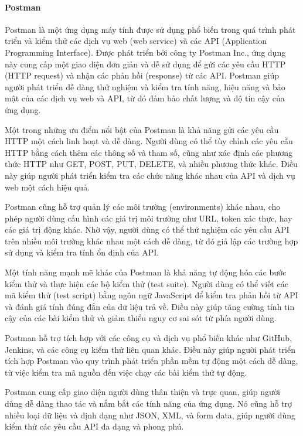 \paragraph{Postman}
\mbox{}

Postman là một ứng dụng máy tính được sử dụng phổ biến trong quá trình phát triển và kiểm thử các dịch vụ web (web service) và các API (Application Programming Interface). Được phát triển bởi công ty Postman Inc., ứng dụng này cung cấp một giao diện đơn giản và dễ sử dụng để gửi các yêu cầu HTTP (HTTP request) và nhận các phản hồi (response) từ các API. Postman giúp người phát triển dễ dàng thử nghiệm và kiểm tra tính năng, hiệu năng và bảo mật của các dịch vụ web và API, từ đó đảm bảo chất lượng và độ tin cậy của ứng dụng.

Một trong những ưu điểm nổi bật của Postman là khả năng gửi các yêu cầu HTTP một cách linh hoạt và dễ dàng. Người dùng có thể tùy chỉnh các yêu cầu HTTP bằng cách thêm các thông số và tham số, cũng như xác định các phương thức HTTP như GET, POST, PUT, DELETE, và nhiều phương thức khác. Điều này giúp người phát triển kiểm tra các chức năng khác nhau của API và dịch vụ web một cách hiệu quả.

Postman cũng hỗ trợ quản lý các môi trường (environments) khác nhau, cho phép người dùng cấu hình các giá trị môi trường như URL, token xác thực, hay các giá trị động khác. Nhờ vậy, người dùng có thể thử nghiệm các yêu cầu API trên nhiều môi trường khác nhau một cách dễ dàng, từ đó giả lập các trường hợp sử dụng và kiểm tra tính ổn định của API.

Một tính năng mạnh mẽ khác của Postman là khả năng tự động hóa các bước kiểm thử và thực hiện các bộ kiểm thử (test suite). Người dùng có thể viết các mã kiểm thử (test script) bằng ngôn ngữ JavaScript để kiểm tra phản hồi từ API và đánh giá tính đúng đắn của dữ liệu trả về. Điều này giúp tăng cường tính tin cậy của các bài kiểm thử và giảm thiểu nguy cơ sai sót từ phía người dùng.

Postman hỗ trợ tích hợp với các công cụ và dịch vụ phổ biến khác như GitHub, Jenkins, và các công cụ kiểm thử liên quan khác. Điều này giúp người phát triển tích hợp Postman vào quy trình phát triển phần mềm tự động một cách dễ dàng, từ việc kiểm tra mã nguồn đến việc chạy các bài kiểm thử tự động.

Postman cung cấp giao diện người dùng thân thiện và trực quan, giúp người dùng dễ dàng thao tác và nắm bắt các tính năng của ứng dụng. Nó cũng hỗ trợ nhiều loại dữ liệu và định dạng như JSON, XML, và form data, giúp người dùng kiểm thử các yêu cầu API đa dạng và phong phú.

